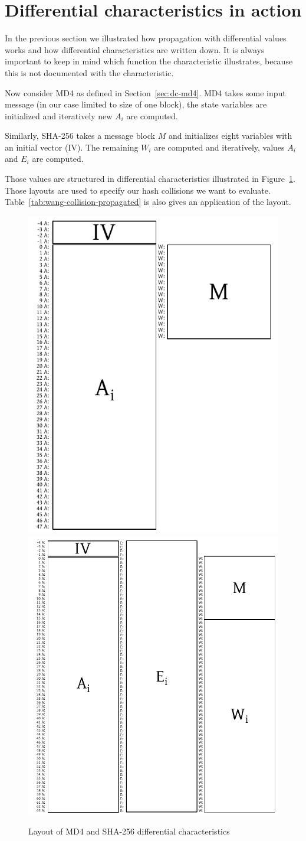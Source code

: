\section{Differential characteristics in action}
\label{sec:dc-actual-chars}
%
In the previous section we illustrated how propagation with differential values
works and how differential characteristics are written down. It is always
important to keep in mind which function the characteristic illustrates,
because this is not documented with the characteristic.

Now consider MD4 as defined in Section~\ref{sec:dc-md4}. MD4 takes some input
message (in our case limited to size of one block), the state variables
are initialized and iteratively new $A_i$ are computed.

Similarly, SHA-256 takes a message block $M$ and initializes eight
variables with an initial vector (IV). The remaining $W_i$ are computed
and iteratively, values $A_i$ and $E_i$ are computed.

Those values are structured in differential characteristics illustrated
in Figure~\ref{img:char-layouts}. Those layouts are used to specify our
hash collisions we want to evaluate. Table~\ref{tab:wang-collision-propagated}
is also gives an application of the layout.

\begin{figure}[p]
  \begin{center}
    \includegraphics[width=0.4\linewidth]{img/md4_layout.pdf}
    \includegraphics[width=0.5\linewidth]{img/sha256_layout.pdf}
    \caption{Layout of MD4 and SHA-256 differential characteristics}
    \label{img:char-layouts}
  \end{center}
\end{figure}


